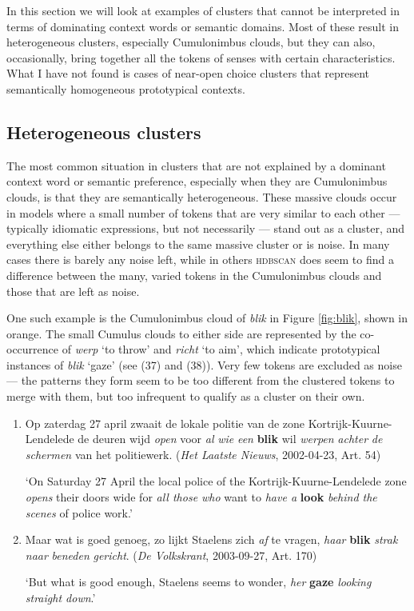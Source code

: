 \documentclass[
]{book}
\begin{document}
In this section we will look at examples of clusters that cannot be interpreted in terms of dominating context words or semantic domains. Most of these result in heterogeneous clusters, especially Cumulonimbus clouds, but they can also, occasionally, bring together all the tokens of senses with certain characteristics. What I have not found is cases of near-open choice clusters that represent semantically homogeneous prototypical contexts.

\hypertarget{blik}{%
\subsection{Heterogeneous clusters}\label{blik}}

The most common situation in clusters that are not explained by a dominant context word or semantic preference, especially when they are Cumulonimbus clouds, is that they are semantically heterogeneous. These massive clouds occur in models where a small number of tokens that are very similar to each other --- typically idiomatic expressions, but not necessarily --- stand out as a cluster, and everything else either belongs to the same massive cluster or is noise. In many cases there is barely any noise left, while in others \textsc{hdbscan} does seem to find a difference between the many, varied tokens in the Cumulonimbus clouds and those that are left as noise.

One such example is the Cumulonimbus cloud of \emph{blik} in Figure \ref{fig:blik}, shown in orange. The small Cumulus clouds to either side are represented by the co-occurrence of \emph{werp} `to throw' and \emph{richt} `to aim', which indicate prototypical instances of \emph{blik} `gaze' (see (37) and (38)). Very few tokens are excluded as noise --- the patterns they form seem to be too different from the clustered tokens to merge with them, but too infrequent to qualify as a cluster on their own.

\begin{enumerate}
\def\labelenumi{(\arabic{enumi})}
\setcounter{enumi}{36}
\item
  Op zaterdag 27 april zwaait de lokale politie van de zone Kortrijk-Kuurne-Lendelede de deuren wijd \emph{open} voor \emph{al} \emph{wie} \emph{een} \textbf{blik} wil \emph{werpen} \emph{achter} \emph{de} \emph{schermen} van het politiewerk. (\emph{Het Laatste Nieuws}, 2002-04-23, Art. 54)

  `On Saturday 27 April the local police of the Kortrijk-Kuurne-Lendelede zone \emph{opens} their doors wide for \emph{all those who} want to \emph{have a} \textbf{look} \emph{behind the scenes} of police work.'
\item
  Maar wat is goed genoeg, zo lijkt Staelens zich \emph{af} te vragen, \emph{haar} \textbf{blik} \emph{strak} \emph{naar} \emph{beneden} \emph{gericht}. (\emph{De Volkskrant}, 2003-09-27, Art. 170)

  `But what is good enough, Staelens seems to wonder, \emph{her} \textbf{gaze} \emph{looking straight down}.'
\end{enumerate}
\end{document}
